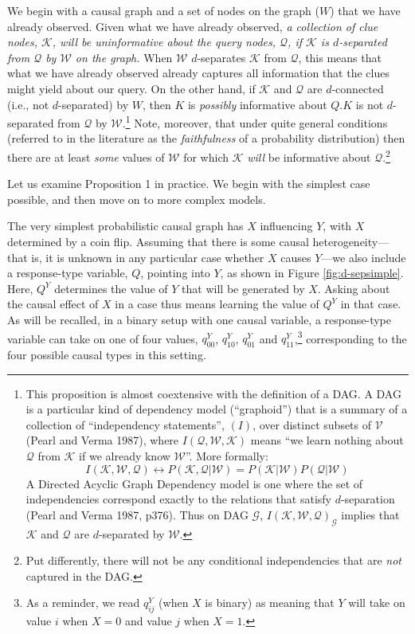 \documentclass[12pt,]{book}
\let\rmarkdownfootnote\footnote%
\def\footnote{\protect\rmarkdownfootnote}
\begin{document}
We begin with a causal graph and a set of nodes on the graph (\(W\)) that we have already observed. Given what we have already observed, \emph{a collection of clue nodes, \(\mathcal K\), will be uninformative about the query nodes, \(\mathcal Q\), if \(\mathcal K\) is \(d\)-separated from \(\mathcal Q\) by \(\mathcal W\) on the graph.} When \(\mathcal W\) \(d\)-separates \(\mathcal K\) from \(\mathcal Q\), this means that what we have already observed already captures all information that the clues might yield about our query. On the other hand, if \(\mathcal K\) and \(\mathcal Q\) are \(d\)-connected (i.e., not \(d\)-separated) by \(W\), then \(K\) is \emph{possibly} informative about \(Q\).\(K\) is not \(d\)-separated from \(\mathcal Q\) by \(\mathcal W\).\footnote{This proposition is almost coextensive with the definition of a DAG. A DAG is a particular kind of dependency model (``graphoid'') that is a summary of a collection of ``independency statements'', \((I)\), over distinct subsets of \(\mathcal V\) (Pearl and Verma 1987), where \(I(\mathcal Q,\mathcal W,\mathcal K)\) means ``we learn nothing about \(\mathcal Q\) from \(\mathcal K\) if we already know \(\mathcal W\)''. More formally:
  \[I(\mathcal K, \mathcal W,\mathcal Q) \leftrightarrow P(\mathcal K,\mathcal Q|\mathcal W)=P(\mathcal K|\mathcal W)P(\mathcal Q|\mathcal W)\]
  A Directed Acyclic Graph Dependency model is one where the set of independencies correspond exactly to the relations that satisfy \(d\)-separation (Pearl and Verma 1987, p376). Thus on DAG \(\mathcal G\), \(I(\mathcal K,\mathcal W,\mathcal Q)_\mathcal G\) implies that \(\mathcal K\) and \(\mathcal Q\) are \(d\)-separated by \(\mathcal W\).} Note, moreover, that under quite general conditions (referred to in the literature as the \emph{faithfulness} of a probability distribution) then there are at least \emph{some} values of \(\mathcal W\) for which \(\mathcal K\) \emph{will} be informative about \(\mathcal Q\).\footnote{Put differently, there will not be any conditional independencies that are \emph{not} captured in the DAG.}

Let us examine Proposition 1 in practice. We begin with the simplest case possible, and then move on to more complex models.

The very simplest probabilistic causal graph has \(X\) influencing \(Y\), with \(X\) determined by a coin flip. Assuming that there is some causal heterogeneity---that is, it is unknown in any particular case whether \(X\) causes \(Y\)---we also include a response-type variable, \(Q\), pointing into \(Y\), as shown in Figure \ref{fig:d-sepsimple}. Here, \(Q^Y\) determines the value of \(Y\) that will be generated by \(X\). Asking about the causal effect of \(X\) in a case thus means learning the value of \(Q^Y\) in that case. As will be recalled, in a binary setup with one causal variable, a response-type variable can take on one of four values, \(q^Y_{00}\), \(q^Y_{10}\), \(q^Y_{01}\) and \(q^Y_{11}\),\footnote{As a reminder, we read \(q^Y_{ij}\) (when \(X\) is binary) as meaning that \(Y\) will take on value \(i\) when \(X=0\) and value \(j\) when \(X=1\).} corresponding to the four possible causal types in this setting.
\end{document}
